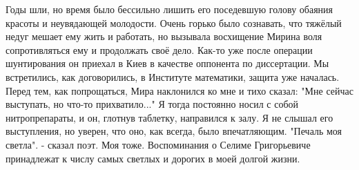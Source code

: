 Годы шли, но время было бессильно лишить его поседевшую голову обаяния красоты и неувядающей молодости. Очень горько было сознавать, что тяжёлый недуг мешает ему жить и работать, но вызывала восхищение Мирина воля сопротивляться ему и продолжать своё дело. Как-то уже после операции шунтирования он приехал в Киев в качестве оппонента по диссертации. Мы встретились, как договорились, в Институте математики, защита уже началась. Перед тем, как попрощаться, Мира наклонился ко мне и тихо сказал: "Мне сейчас выступать, но что-то прихватило..." Я тогда постоянно носил с собой нитропрепараты, и он, глотнув таблетку, направился к залу. Я не слышал его выступления, но уверен, что оно, как всегда, было впечатляющим.
"Печаль моя светла". - сказал поэт. Моя тоже. Воспоминания о Селиме Григорьевиче принадлежат к числу самых светлых и дорогих в моей долгой жизни.

